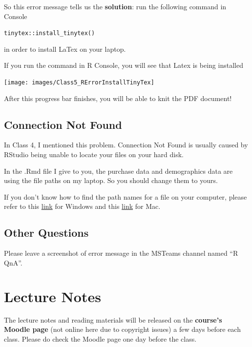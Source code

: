 \documentclass[
  11pt,
]{book}
\begin{document}
So this error message tells us the \textbf{solution}: run the following command in Console

\texttt{tinytex::install\_tinytex()}

in order to install LaTex on your laptop.

If you run the command in R Console, you will see that Latex is being installed

\begin{center}\texttt{[image: images/Class5\_RErrorInstallTinyTex]} \end{center}

After this progress bar finishes, you will be able to knit the PDF document!

\hypertarget{connection-not-found}{%
\section{Connection Not Found}\label{connection-not-found}}

In Class 4, I mentioned this problem. Connection Not Found is usually caused by RStudio being unable to locate your files on your hard disk.

In the .Rmd file I give to you, the purchase data and demographics data are using the file paths on my laptop. So you should change them to yours.

If you don't know how to find the path names for a file on your computer, please refer to this \href{https://www.sony.com/electronics/support/articles/00015251}{link} for Windows and this \href{https://macpaw.com/how-to/get-file-path-mac}{link} for Mac.

\hypertarget{other-questions}{%
\section{Other Questions}\label{other-questions}}

Please leave a screenshot of error message in the MSTeams channel named ``R QnA''.

\hypertarget{lecture-notes}{%
\chapter{Lecture Notes}\label{lecture-notes}}

The lecture notes and reading materials will be released on the \textbf{course's Moodle page} (not online here due to copyright issues) a few days before each class. Please do check the Moodle page one day before the class.
\end{document}
